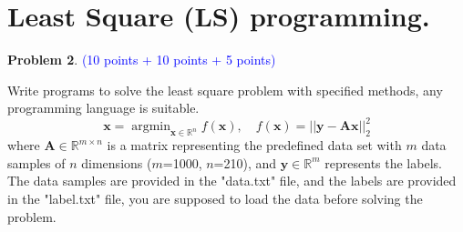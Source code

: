\documentclass[english,onecolumn]{IEEEtran}
\newcommand{\Rbb}{\mathbb{R}}
\begin{document}
\newpage
\section{Least Square (LS) programming.}
\noindent\textbf{Problem 2}. \textcolor{blue}{(10 points + 10 points + 5 points)}

Write programs to solve the least square problem with specified methods, any programming language is suitable.
$$
\mathbf{x} = \mathop{\arg\min}_{\mathbf{x} \in \Rbb^n} f(\mathbf{x}), \quad f(\mathbf{x}) = ||\mathbf{y}-\mathbf{A}\mathbf{x}||_2^2
$$
where $\mathbf{A} \in \Rbb^{m \times n}$ is a matrix representing the predefined data set with $m$ data samples of $n$ dimensions ($m$=1000, $n$=210), and $\mathbf{y} \in \Rbb^m$ represents the labels. The data samples are provided in the "data.txt" file, and the labels are provided in the "label.txt" file, you are supposed to load the data before solving the problem.
\end{document}
